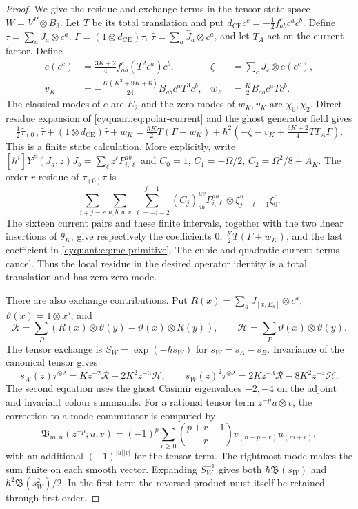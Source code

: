 \begin{proof}
We give the residue and exchange terms in the tensor state space
$W=V^P\otimes B_3$.  Let $T$ be its total translation and put
$d_{\mathrm{CE}}c^c=-\frac12f_{ab}^cc^ac^b$.
Define $\tau=\sum_aJ_a\otimes c^a$,
$\Gamma=(1\otimes d_{\mathrm{CE}})\tau$,
$\widehat\tau=\sum_a\widehat J_a\otimes c^a$, and let $T_A$ act on
the current factor.  Define
\[
 \begin{aligned}
 e(c^c)&=\tfrac{3K+2}{4}f_{ab}^c(T^2c^a)c^b,
 &\zeta&=\sum_cJ_c\otimes e(c^c),\\
 v_K&=-\tfrac{K(K^2+9K+6)}{24}B_{ab}c^aT^3c^b,
 &w_K&=\tfrac K2B_{ab}c^aTc^b.
 \end{aligned}
\]
The classical modes of $e$ are $E_2$ and the zero modes of $w_K,v_K$
are $\chi_0,\chi_2$.  Direct residue expansion of
\eqref{cyquant:eq:polar-current} and the ghost generator field gives
\begin{equation}\label{cyquant:eq:mc-primitive}
 \tfrac12\widehat\tau_{(0)}\widehat\tau
 +(1\otimes d_{\mathrm{CE}})\widehat\tau+w_K
 =\tfrac{\hbar K}{2}T(\Gamma+w_K)
  +\hbar^2\left(-\zeta-v_K+\tfrac{3K+2}{4}TT_A\Gamma\right).
\end{equation}
This is a finite state calculation.  More explicitly, write
$[\hbar^i]Y^P(J_a,z)J_b=\sum_\ell z^\ell P_{i,\ell}^{ab}$ and
$C_0=1$, $C_1=-\Omega/2$, $C_2=\Omega^2/8+A_K$.
The order-$r$ residue of $\tau_{(0)}\tau$ is
\[
 \sum_{i+j=r}\sum_{a,b,u,v}\sum_{\ell=-i-2}^{j-1}
       (C_j)_{ab}^{uv}P_{i,\ell}^{ab}
                        \otimes\xi_{j-\ell-1}^u\xi_0^v.
\]
The sixteen current pairs and these finite intervals, together with
the two linear insertions of $\theta_K$, give respectively the
coefficients $0$, $\frac K2T(\Gamma+w_K)$, and the last coefficient
in \eqref{cyquant:eq:mc-primitive}.  The cubic and quadratic current
terms cancel.  Thus the local residue in the desired operator identity
is a total translation and has zero zero mode.

There are also exchange contributions.  Put
$R(x)=\sum_aJ_{[x,E_a]}\otimes c^a$,
$\vartheta(x)=1\otimes x^\flat$, and
\[
 \mathcal R=\sum_P(R(x)\otimes\vartheta(y)
                   -\vartheta(x)\otimes R(y)),\qquad
 \mathcal H=\sum_P\vartheta(x)\otimes\vartheta(y).
\]
The tensor exchange is $S_W=\exp(-\hbar s_W)$ for $s_W=s_A-s_B$.
Invariance of the canonical tensor gives
\[
 s_W(z)\tau^{\otimes2}=Kz^{-2}\mathcal R-2K^2z^{-3}\mathcal H,
 \qquad
 s_W(z)^2\tau^{\otimes2}=2Kz^{-3}\mathcal R-8K^2z^{-4}\mathcal H.
\]
The second equation uses the ghost Casimir eigenvalues $-2,-4$ on
the adjoint and invariant colour summands.
For a rational tensor term $z^{-p}u\otimes v$, the correction to a
mode commutator is computed by
\[
 \mathfrak B_{m,n}(z^{-p};u,v)
   =(-1)^p\sum_{r\geq0}\binom{p+r-1}{r}
                          v_{(n-p-r)}u_{(m+r)},
\]
with an additional $(-1)^{|u||v|}$ for the tensor term.
The rightmost mode makes the sum finite on each smooth vector.
Expanding $S_W^{-1}$ gives both
$\hbar\mathfrak B(s_W)$ and $\hbar^2\mathfrak B(s_W^2)/2$.
In the first term the reversed product must itself be retained
through first order.


\end{proof}
